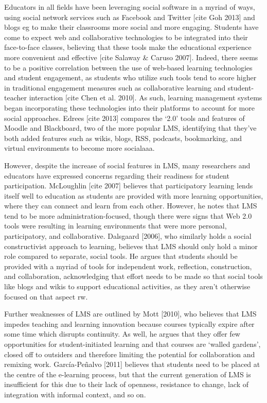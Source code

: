 Educators in all fields have been leveraging social software in a myriad of ways, using social network services such as Facebook and Twitter [cite Goh 2013] and blogs {eg} to make their classrooms more social and more engaging. Students have come to expect web and collaborative technologies to be integrated into their face-to-face classes, believing that these tools make the educational experience more convenient and effective [cite Salaway \& Caruso 2007]. Indeed, there seems to be a positive correlation between the use of web-based learning technologies and student engagement, as students who utilize such tools tend to score higher in traditional engagement measures such as collaborative learning and student-teacher interaction [cite Chen et al. 2010]. As such, learning management systems began incorporating these technologies into their platforms to account for more social approaches. Edrees [cite 2013] compares the ‘2.0’ tools and features of Moodle and Blackboard, two of the more popular LMS, identifying that they’ve both added features such as wikis, blogs, RSS, podcasts, bookmarking, and virtual environments to become more socialaaa.

However, despite the increase of social features in LMS, many researchers and educators have expressed concerns regarding their readiness for student participation. McLoughlin [cite 2007] believes that participatory learning lends itself well to education as students are provided with more learning opportunities, where they can connect and learn from each other. However, he notes that LMS tend to be more administration-focused, though there were signs that Web 2.0 tools were resulting in learning environments that were more personal, participatory, and collaborative. Dalsgaard [2006], who similarly holds a social constructivist approach to learning, believes that LMS should only hold a minor role compared to separate, social tools. He argues that students should be provided with a myriad of tools for independent work, reflection, construction, and collaboration, acknowledging that effort needs to be made so that social tools like blogs and wikis to support educational activities, as they aren't otherwise focused on that aspect {rw}.

Further weaknesses of LMS are outlined by Mott [2010], who believes that LMS impedes teaching and learning innovation because courses typically expire after some time which disrupts continuity. As well, he argues that they offer few opportunities for student-initiated learning and that courses are ‘walled gardens’, closed off to outsiders and therefore limiting the potential for collaboration and remixing work. García-Peñalvo [2011] believes that students need to be placed at the centre of the e-learning process, but that the current generation of LMS is insufficient for this due to their lack of openness, resistance to change, lack of integration with informal context, and so on.

